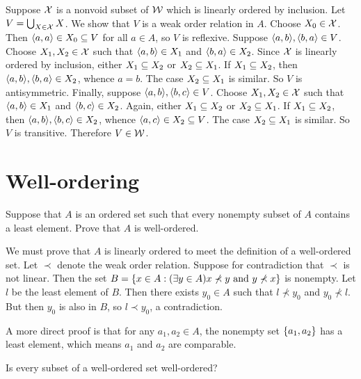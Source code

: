 \begin{solution}
\begin{enumalpha}
    \item Suppose $\mathcal{X}$ is a nonvoid subset of $\mathcal{W}$ which is linearly ordered by inclusion.
    Let $V=\bigcup_{X\in\mathcal{X}} X$. We show that $V$ is a weak order relation in $A$.
    Choose $X_0\in \mathcal{X}$. Then $\left\langle a,a\right\rangle\in X_0\subseteq V$ for all $a\in A$, so $V$ is reflexive.
    Suppose $\aprn{a,b},\aprn{b,a}\in V$. Choose $X_1,X_2\in\mathcal{X}$ such that $\left\langle a,b\right\rangle\in X_1$ and $\left\langle b,a\right\rangle\in X_2$.
    Since $\mathcal{X}$ is linearly ordered by inclusion, either $X_1\subseteq X_2$ or $X_2\subseteq X_1$.
    If $X_1\subseteq X_2$, then $\aprn{a,b},\aprn{b,a}\in X_2$, whence $a=b$. The case $X_2\subseteq X_1$ is similar.
    So $V$ is antisymmetric.
    Finally, suppose $\aprn{a,b},\aprn{b,c}\in V$.
    Choose $X_1,X_2\in\mathcal{X}$ such that $\left\langle a,b\right\rangle\in X_1$ and $\left\langle b,c\right\rangle\in X_2$.
    Again, either $X_1\subseteq X_2$ or $X_2\subseteq X_1$.
    If $X_1\subseteq X_2$, then $\aprn{a,b},\aprn{b,c}\in X_2$, whence $\left\langle a,c\right\rangle\in X_2\subseteq V$.
    The case $X_2\subseteq X_1$ is similar. So $V$ is transitive.
    Therefore $V\in\mathcal{W}$.
\end{enumalpha}
\end{solution}


\section{Well-ordering}
\begin{exercise}
Suppose that $A$ is an ordered set such that every nonempty subset of $A$ contains a
least element. Prove that $A$ is well-ordered.
\end{exercise}

\begin{solution}
We must prove that $A$ is linearly ordered to meet the definition of a well-ordered set.
Let $\prec$ denote the weak order relation.
Suppose for contradiction that $\prec$ is not linear.
Then the set $B=\left\{ x\in A : (\exists y\in A)x\nprec y\text{ and } y\nprec x \right\}$ is nonempty.
Let $l$ be the least element of $B$. Then there exists $y_0\in A$ such that $l\nprec y_0$ and $y_0\nprec l$.
But then $y_0$ is also in $B$, so $l\prec y_0$, a contradiction.

A more direct proof is that for any $a_1,a_2\in A$, the nonempty set $\left\{a_1,a_2\right\}$ has a least
element, which means $a_1$ and $a_2$ are comparable.
\end{solution}

\begin{exercise}
Is every subset of a well-ordered set well-ordered?
\end{exercise}

